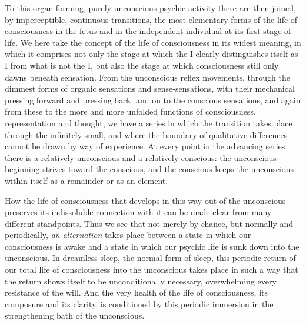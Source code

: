 \documentclass[12pt,a4paper,openany]{book}
\begin{document}
To this organ-forming, purely unconscious psychic activity there are
then joined, by imperceptible, continuous transitions, the most
elementary forms of the life of consciousness in the fetus and in the
independent individual at its first stage of life. We here take the
concept of the life of consciousness in its widest meaning, in which it
comprises not only the stage at which the I clearly distinguishes itself
as I from what is not the I, but also the stage at which consciousness
still only dawns beneath sensation. From the unconscious reflex movements,
through the dimmest forms of organic sensations and sense-sensations,
with their mechanical pressing forward and pressing back, and on to the
conscious sensations, and again from these to the more and more unfolded
functions of consciousness, representation and thought, we have a series
in which the transition takes place through the infinitely small, and
where the boundary of qualitative differences cannot be drawn by way of
experience. At every point in the advancing series there is a relatively
unconscious and a relatively conscious: the unconscious beginning strives
toward the conscious, and the conscious keeps the unconscious within
itself as a remainder or as an element.

How the life of consciousness that develops in this way out of the
unconscious preserves its indissoluble connection with it can be made
clear from many different standpoints. Thus we see that not merely by
chance, but normally and periodically, \emph{an alternation} takes place
between a state in which our consciousness is awake and a state in which
our psychic life is sunk down into the unconscious. In dreamless sleep,
the normal form of sleep, this periodic return of our total life of
consciousness into the unconscious takes place in such a way that the
return shows itself to be unconditionally necessary, overwhelming every
resistance of the will. And the very health of the life of consciousness,
its composure and its clarity, is conditioned by this periodic immersion
in the strengthening bath of the unconscious.
\end{document}
